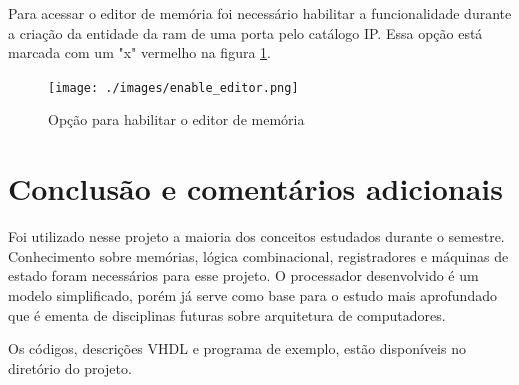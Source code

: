 \documentclass[a4paper, 12pt]{article}
\begin{document}
Para acessar o editor de memória foi necessário habilitar a funcionalidade durante a criação da entidade
da ram de uma porta pelo catálogo IP. Essa opção está marcada com um "x" vermelho na figura \ref{fig:enable_editor}.

\begin{figure}[ht]
	\centering
	\texttt{[image: ./images/enable\_editor.png]}
	\caption{Opção para habilitar o editor de memória}
	\label{fig:enable_editor}
\end{figure}

\newpage
\section{Conclusão e comentários adicionais}
Foi utilizado nesse projeto a maioria dos conceitos estudados durante o semestre.
Conhecimento sobre memórias, lógica combinacional, registradores e máquinas de estado foram necessários para esse projeto.
O processador desenvolvido é um modelo simplificado, porém já serve como base para o estudo mais aprofundado 
que é ementa de disciplinas futuras sobre arquitetura de computadores.

Os códigos, descrições VHDL e programa de exemplo, estão disponíveis no diretório do projeto.



\newpage
\printbibliography
\end{document}

